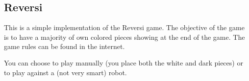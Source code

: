 \subsection{Reversi}

This is a simple implementation of the Reversi game. The objective of
the game is to have a majority of own colored pieces showing at the end
of the game. The game rules can be found in the internet.

You can choose to play manually (you place both the white and dark pieces)
or to play against a (not very smart) robot.
